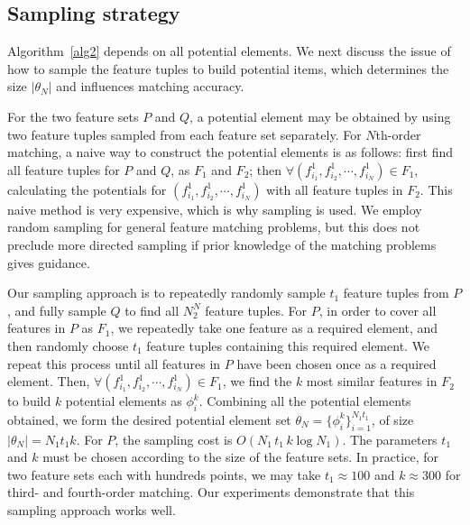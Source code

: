 \subsection{Sampling strategy}
\label{subsec:sampling}

Algorithm~\ref{alg2} depends on all potential elements.
We next discuss the issue of how to sample the feature tuples to build potential items, which determines the size $|\theta_N|$ and influences matching accuracy.

For the two feature sets $P$ and $Q$,
a potential element may be obtained by using two feature tuples sampled from each feature set separately.
For $N$th-order matching, a naive way to construct the potential elements is as follows:
first find all feature tuples for $P$ and $Q$, as $F_1$ and $F_2$; then $\forall (f_{i_1}^1, f_{i_2}^1, \cdots, f_{i_N}^1)\in F_1$,
calculating the potentials for $(f_{i_1}^1, f_{i_2}^1, \cdots, f_{i_N}^1)$ with all feature tuples in $F_2$.
This naive method is very expensive, which is why sampling is used.
We employ random sampling for general feature matching problems, but this does not preclude more directed sampling if prior knowledge of the matching problems gives
guidance.

Our sampling approach is to repeatedly randomly sample $t_1$ feature tuples from $P$, and fully sample $Q$ to find all $N_2^N$ feature tuples.
For $P$, in order to cover all features in $P$ as $F_1$, we repeatedly take one feature as a required element,
and then randomly choose $t_1$ feature tuples containing this required element.
We repeat this process until all features in $P$ have been chosen once as a required element.
Then, $\forall (f_{i_1}^1, f_{i_2}^1, \cdots, f_{i_N}^1)\in F_1$, we find the $k$ most similar features in $F_2$ to build $k$ potential elements as $\phi_i^k$.
Combining all the potential elements obtained, we form the desired potential element set $\theta_N = \{\phi_i^k\}_{i=1}^{N_1 t_1}$, of size $|\theta_N| = N_1 t_1 k$.
For $P$, the sampling cost is $O(N_1\, t_1\,  k\log N_1)$.
The parameters $t_1$ and $k$ must be chosen according to the size of the feature sets.
In practice, for two feature sets each with hundreds points,
we may take $t_1 \approx 100$ and $k \approx 300$ for third- and fourth-order matching.
Our experiments demonstrate that this sampling approach works well.


